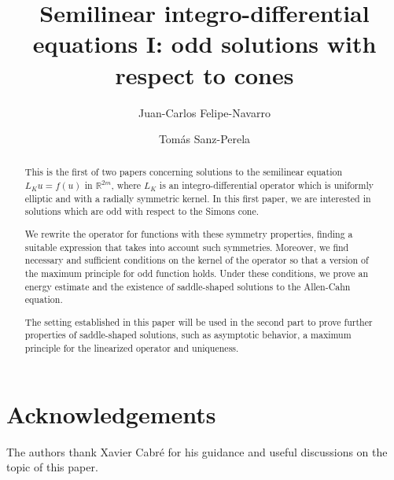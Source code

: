 \documentclass[12pt,reqno]{amsart}
\title[Semilinear integro-differential equations I]{Semilinear integro-differential equations I: odd solutions with respect to cones}
\author{Juan-Carlos Felipe-Navarro}
\author{Tomás Sanz-Perela}
\theoremstyle{definition}
\theoremstyle{remark}
\newcommand{\con}[1]{\mathbb{#1}}
\newcommand{\R}{\con{R}} %
\numberwithin{equation}{section}
\begin{document}
\begin{abstract}
This is the first of two papers concerning solutions to the semilinear equation $L_K u = f(u)$ in $\R^{2m}$, where $L_K$ is an integro-differential operator which is uniformly elliptic and with a radially symmetric kernel. In this first paper, we are interested in solutions which are odd with respect to the Simons cone. 

We rewrite the operator for functions with these symmetry properties, finding a suitable expression that takes into account such symmetries. Moreover, we find necessary and sufficient conditions on the kernel of the operator so that a version of the maximum principle for odd function holds. Under these conditions, we prove an energy estimate and the existence of saddle-shaped solutions to the Allen-Cahn equation.

The setting established in this paper will be used in the second part to prove further properties of saddle-shaped solutions, such as asymptotic behavior, a maximum principle for the linearized operator and uniqueness.
\end{abstract}


\maketitle


\tableofcontents













\appendix




\section*{Acknowledgements}

The authors thank Xavier Cabré for his guidance and useful discussions on the topic of this paper.



\end{document}
